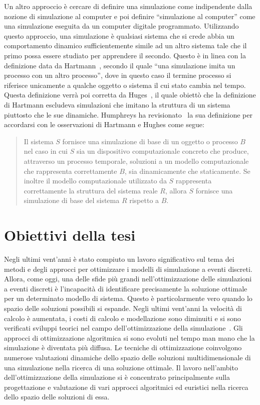 \documentclass[12pt,a4paper,openright,twoside]{book}
\begin{document}
Un altro approccio è cercare di definire una simulazione come indipendente dalla nozione di simulazione al computer e poi definire ``simulazione al computer'' come una simulazione eseguita da un computer digitale programmato. Utilizzando questo approccio, una simulazione è qualsiasi sistema che si crede abbia un comportamento dinamico sufficientemente simile ad un altro sistema tale che il primo possa essere studiato per apprendere il secondo. Questo è in linea con la definizione data da Hartmann~\cite{Hartmann1996-HARTWA-2}, secondo il quale ``una simulazione imita un processo con un altro processo'', dove in questo caso il termine processo si riferisce unicamente a qualche oggetto o sistema il cui stato cambia nel tempo. Questa definizione verrà poi corretta da Huges~\cite{Hughes_1999}, il quale obiettò che la definizione di Hartmann escludeva simulazioni che imitano la struttura di un sistema piuttosto che le sue dinamiche. 
Humphreys ha revisionato~\cite{Humphreys2004-HUMEOC-2} la sua definizione per accordarsi con le osservazioni di Hartmann e Hughes come segue: 
\begin{quotation}
    Il sistema $S$ fornisce una simulazione di base di un oggetto o processo $B$ nel caso in cui $S$ sia un dispositivo computazionale concreto che produce, attraverso un processo temporale, soluzioni a un modello computazionale che rappresenta correttamente $B$, sia dinamicamente che staticamente. Se inoltre il modello computazionale utilizzato da $S$ rappresenta correttamente la struttura del sistema reale $R$, allora $S$ fornisce una simulazione di base del sistema $R$ rispetto a $B$. 
\end{quotation}


\section{Obiettivi della tesi}
Negli ultimi vent'anni è stato compiuto un lavoro significativo sul tema dei metodi e degli approcci per ottimizzare i modelli di simulazione a eventi discreti. Allora, come oggi, una delle sfide più grandi nell'ottimizzazione delle simulazioni a eventi discreti è l'incapacità di identificare precisamente la soluzione ottimale per un determinato modello di sistema. Questo è particolarmente vero quando lo spazio delle soluzioni possibili si espande.
Negli ultimi vent'anni la velocità di calcolo è aumentata, i costi di calcolo e modellazione sono diminuiti e si sono verificati sviluppi teorici nel campo dell'ottimizzazione della simulazione~\cite{DBLP:conf/scsc/Riley13}.
Gli approcci di ottimizzazione algoritmica si sono evoluti nel tempo man mano che la simulazione è diventata più diffusa. Le tecniche di ottimizzazione coinvolgono numerose valutazioni dinamiche dello spazio delle soluzioni multidimensionale di una simulazione nella ricerca di una soluzione ottimale. Il lavoro nell'ambito dell'ottimizzazione della simulazione si è concentrato principalmente sulla progettazione e valutazione di vari approcci algoritmici ed euristici nella ricerca dello spazio delle soluzioni di essa.
\end{document}
